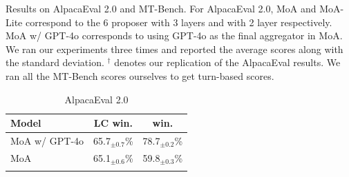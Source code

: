 \documentclass{article}
\begin{document}
\begin{table}[t]
    \centering
    \small
    \caption{Results on AlpacaEval 2.0 and MT-Bench. For AlpacaEval 2.0, MoA and MoA-Lite correspond to the 6 proposer with 3 layers and with 2 layer respectively. 
    MoA w/ GPT-4o corresponds to using GPT-4o as the final aggregator in MoA.
    We ran our experiments three times and reported the average scores along with the standard deviation.
    $^\dagger$ denotes our replication of the AlpacaEval results.
    We ran all the MT-Bench scores ourselves to get turn-based scores.
    }
    \begin{subtable}{0.42\linewidth}
        \setlength{\tabcolsep}{4pt}
        \centering
        \caption{AlpacaEval 2.0}
        \begin{tabular}{@{}lcc@{}}
        \toprule
        Model               & LC win.   & win. \\
        \midrule
        \rowcolor{Gray}
        MoA w/ GPT-4o            &   65.7$_{\pm \text{0.7}}$\%      & 78.7$_{\pm \text{0.2}}$\% \\
        \rowcolor{Gray}
        MoA{}            &   65.1$_{\pm \text{0.6}}$\%      & 59.8$_{\pm \text{0.3}}$\%          \\
        \rowcolor{Gray}

\end{tabular}
\end{subtable}
\end{table}
\end{document}
